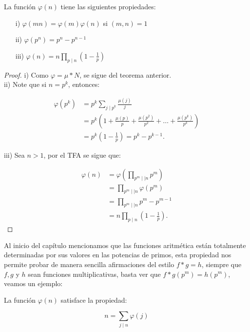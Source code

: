 \begin{corollary}
La función $\varphi(n)$ tiene las siguientes propiedades:

\begin{itemize}
\item[i)] $\varphi(mn)=\varphi(m)\varphi(n)$ si $(m,n)=1$

\item[ii)] $\varphi(p^n)=p^n-p^{n-1}$

\item[iii)] $\varphi(n)=n\displaystyle\prod_{p\mid n}\left(1-\frac{1}{p}\right)  $
\end{itemize}
\end{corollary}



\begin{proof}

i) Como $\varphi=\mu* N$, se sigue del teorema anterior.\\

ii) Note que si $n=p^k$, entonces:

\begin{align*}
    \varphi(p^k)&=p^k\sum_{j\mid p^k}\frac{\mu(j)}{j}\\
    &=p^k\left(1+\frac{\mu(p)}{p}+\frac{\mu(p^2)}{p^2}+\ldots+\frac{\mu(p^k)}{p^k}\right)\\
    &=p^k \left(1-\frac{1}{p}\right)=p^k-p^{k-1}
.\end{align*}

iii) Sea $n>1$, por el TFA se sigue que:

\begin{align*}
    \varphi(n)&= \varphi \left( \prod_{p^m\mid\mid n}p^m \right)\\
    &= \prod_{p^m\mid\mid n}\varphi(p^m)\\
    &=  \prod_{p^m\mid\mid n} p^m-p^{m-1}\\
    &=n \prod_{p\mid n}\left( 1-\frac{1}{p} \right)
.\end{align*}
\end{proof}

Al inicio del capítulo mencionamos que las funciones aritmética están totalmente determinadas por sus valores en las potencias de primos, esta propiedad nos permite probar de manera sencilla afirmaciones del estilo $f*g=h$, siempre que $f,g$ y $h$ sean funciones multiplicativas, basta ver que $f*g(p^m)=h(p^m)$, veamos un ejemplo:

\begin{theorem}
La función $\varphi(n)$ satisface la propiedad:

$$n=\sum_{j\mid n}\varphi(j)$$
\end{theorem}

